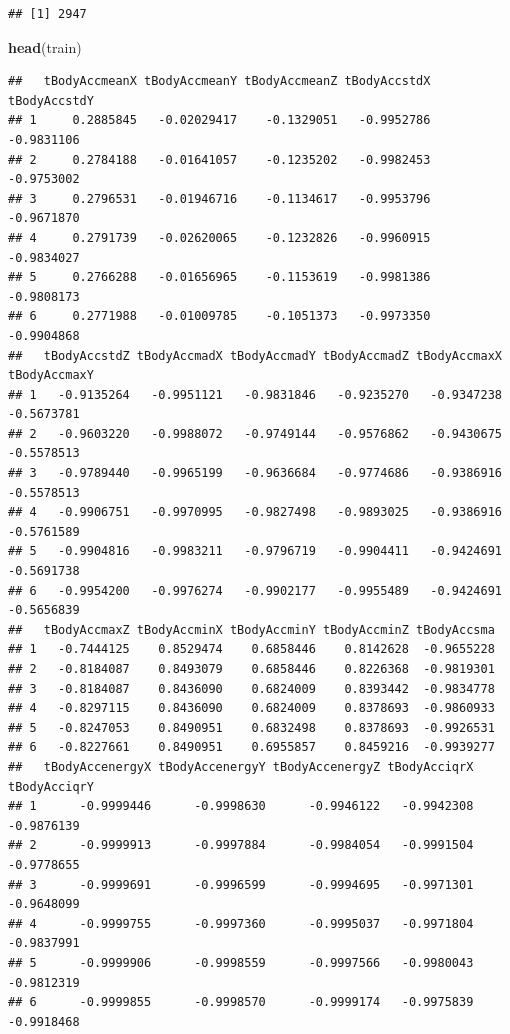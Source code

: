 \documentclass[
]{article}
\newenvironment{Shaded}{\begin{snugshade}}{\end{snugshade}}
\newcommand{\FunctionTok}[1]{\textcolor[rgb]{0.13,0.29,0.53}{\textbf{#1}}}
\newcommand{\NormalTok}[1]{#1}
\begin{document}
\begin{verbatim}
## [1] 2947
\end{verbatim}

\begin{Shaded}
\begin{Highlighting}[]
\FunctionTok{head}\NormalTok{(train)}
\end{Highlighting}
\end{Shaded}

\begin{verbatim}
##   tBodyAccmeanX tBodyAccmeanY tBodyAccmeanZ tBodyAccstdX tBodyAccstdY
## 1     0.2885845   -0.02029417    -0.1329051   -0.9952786   -0.9831106
## 2     0.2784188   -0.01641057    -0.1235202   -0.9982453   -0.9753002
## 3     0.2796531   -0.01946716    -0.1134617   -0.9953796   -0.9671870
## 4     0.2791739   -0.02620065    -0.1232826   -0.9960915   -0.9834027
## 5     0.2766288   -0.01656965    -0.1153619   -0.9981386   -0.9808173
## 6     0.2771988   -0.01009785    -0.1051373   -0.9973350   -0.9904868
##   tBodyAccstdZ tBodyAccmadX tBodyAccmadY tBodyAccmadZ tBodyAccmaxX tBodyAccmaxY
## 1   -0.9135264   -0.9951121   -0.9831846   -0.9235270   -0.9347238   -0.5673781
## 2   -0.9603220   -0.9988072   -0.9749144   -0.9576862   -0.9430675   -0.5578513
## 3   -0.9789440   -0.9965199   -0.9636684   -0.9774686   -0.9386916   -0.5578513
## 4   -0.9906751   -0.9970995   -0.9827498   -0.9893025   -0.9386916   -0.5761589
## 5   -0.9904816   -0.9983211   -0.9796719   -0.9904411   -0.9424691   -0.5691738
## 6   -0.9954200   -0.9976274   -0.9902177   -0.9955489   -0.9424691   -0.5656839
##   tBodyAccmaxZ tBodyAccminX tBodyAccminY tBodyAccminZ tBodyAccsma
## 1   -0.7444125    0.8529474    0.6858446    0.8142628  -0.9655228
## 2   -0.8184087    0.8493079    0.6858446    0.8226368  -0.9819301
## 3   -0.8184087    0.8436090    0.6824009    0.8393442  -0.9834778
## 4   -0.8297115    0.8436090    0.6824009    0.8378693  -0.9860933
## 5   -0.8247053    0.8490951    0.6832498    0.8378693  -0.9926531
## 6   -0.8227661    0.8490951    0.6955857    0.8459216  -0.9939277
##   tBodyAccenergyX tBodyAccenergyY tBodyAccenergyZ tBodyAcciqrX tBodyAcciqrY
## 1      -0.9999446      -0.9998630      -0.9946122   -0.9942308   -0.9876139
## 2      -0.9999913      -0.9997884      -0.9984054   -0.9991504   -0.9778655
## 3      -0.9999691      -0.9996599      -0.9994695   -0.9971301   -0.9648099
## 4      -0.9999755      -0.9997360      -0.9995037   -0.9971804   -0.9837991
## 5      -0.9999906      -0.9998559      -0.9997566   -0.9980043   -0.9812319
## 6      -0.9999855      -0.9998570      -0.9999174   -0.9975839   -0.9918468

\end{verbatim}
\end{document}
